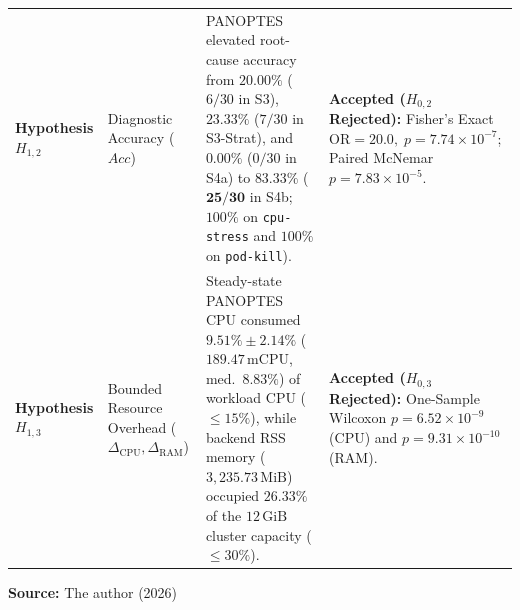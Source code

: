 \begin{table}[htbp]
\begin{tabularx}{\textwidth}{@{} l p{2.8cm} X p{3.6cm} @{}}
        \addlinespace
        \textbf{Hypothesis $H_{1,2}$} & Diagnostic Accuracy ($Acc$) & PANOPTES elevated root-cause accuracy from $20.00\%$ ($6/30$ in S3), $23.33\%$ ($7/30$ in S3-Strat), and $0.00\%$ ($0/30$ in S4a) to $\mathbf{83.33\%}$ ($\mathbf{25/30}$ in S4b; $100\%$ on \texttt{cpu-stress} and $100\%$ on \texttt{pod-kill}). & \textbf{Accepted ($H_{0,2}$ Rejected):} Fisher's Exact $\text{OR} = 20.0, \; p = 7.74 \times 10^{-7}$; Paired McNemar $p = 7.83 \times 10^{-5}$. \\
        \addlinespace
        \textbf{Hypothesis $H_{1,3}$} & Bounded Resource Overhead ($\Delta_{\text{CPU}}, \Delta_{\text{RAM}}$) & Steady-state PANOPTES CPU consumed $\mathbf{9.51\% \pm 2.14\%}$ ($189.47\,\text{mCPU}$, med.\ $8.83\%$) of workload CPU ($\le 15\%$), while backend RSS memory ($3{,}235.73\,\text{MiB}$) occupied $\mathbf{26.33\%}$ of the $12\,\text{GiB}$ cluster capacity ($\le 30\%$). & \textbf{Accepted ($H_{0,3}$ Rejected):} One-Sample Wilcoxon $p = 6.52 \times 10^{-9}$ (CPU) and $p = 9.31 \times 10^{-10}$ (RAM). \\
        \bottomrule
    \end{tabularx}
    \par\medskip\ABNTEXfontereduzida\selectfont\textbf{Source:} The author (2026) \par\medskip
\end{table}
